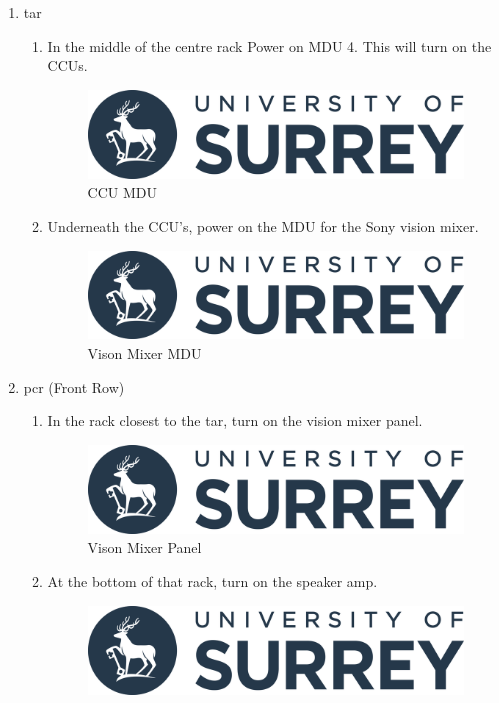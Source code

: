 \documentclass{report}
\begin{document}
\begin{enumerate}
    \item \gls{tar}
          \begin{enumerate}
              \item In the middle of the centre rack Power on MDU 4. This will turn on the CCUs.
              \begin{figure}[h]
                \centering
                \includegraphics[width=.5\linewidth]{uos-logo.png}
                \caption{CCU MDU}
              \end{figure}
              \item Underneath the CCU's, power on the MDU for the Sony vision mixer.
              \begin{figure}[h]
                \centering
                \includegraphics[width=.5\linewidth]{uos-logo.png}
                \caption{Vison Mixer MDU}
              \end{figure}
          \end{enumerate}
    \item \gls{pcr} (Front Row)
          \begin{enumerate}
              \item In the rack closest to the \gls{tar}, turn on the vision mixer panel.
              \begin{figure}[h]
                \centering
                \includegraphics[width=.5\linewidth]{uos-logo.png}
                \caption{Vison Mixer Panel}
              \end{figure}
              \item At the bottom of that rack, turn on the speaker amp.
              \begin{figure}[h]
                \centering
                \includegraphics[width=.5\linewidth]{uos-logo.png}

\end{figure}
\end{enumerate}
\end{enumerate}
\end{document}
